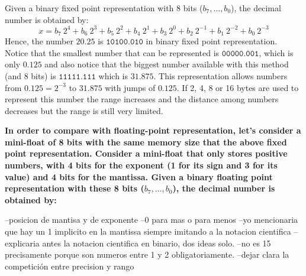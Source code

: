 Given a binary fixed point representation with 8 bits ($b_7, \ldots, b_0$), the decimal number is obtained by: 
$$
   x = b_7 \ 2^4 + b_6 \ 2^3 + b_5 \ 2^2  + b_4 \ 2^1 + b_3 \ 2^0 + b_2 \ 2^{-1}  + b_1 \ 2^{-2} + b_0 \ 2^{-3}
$$
Hence, the number $20.25$ is $\texttt{10100.010}$ in binary fixed point 
representation. 
Notice that the smallest number that can be represented is
$\texttt{00000.001}$, which is only $0.125$ 
and also notice that the biggest number available with this method (and 8 bits) is $\texttt{11111.111}$
which is $31.875$. 
This representation allows numbers from $0.125 = 2^{-3}$ to $31.875$  with jumps of $0.125$. 
If 2, 4, 8 or 16 bytes are used to represent this number the range increases 
and the distance among numbers decreases but the range is still very limited. 








\textbf{In order to compare with floating-point representation,
let's consider a mini-float of 8 bits with the same memory size that 
the above fixed point representation. 
Consider a mini-float that only stores positive numbers, with
4 bits for the exponent (1 for its sign and 3 for its value) and 4  bits for the mantissa.
Given a binary floating point representation with these 8 bits ($b_7, \ldots, b_0$), 
the decimal number is obtained by:}

--posicion de mantisa y de exponente
--0 para mas o para menos
--yo mencionaria que hay un 1 implicito en la mantissa siempre imitando a la notacion cientifica
--explicaria antes la notacion cientifica en binario, dos ideas solo. 
--no es 15 precisamente porque son numeros entre 1 y 2 obligatoriamente.
--dejar clara la competición entre precision y rango



